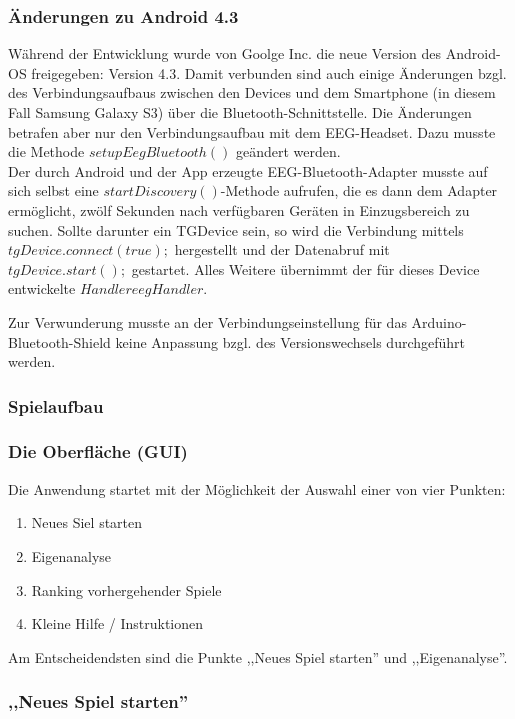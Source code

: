 	\subsubsection*{Änderungen zu Android 4.3}		
		
	Während der Entwicklung wurde von Goolge Inc. die neue Version des Android-OS freigegeben: Version 4.3.
	Damit verbunden sind auch einige Änderungen bzgl. des Verbindungsaufbaus zwischen den Devices und dem Smartphone (in diesem Fall Samsung Galaxy S3) über die Bluetooth-Schnittstelle.
	Die Änderungen betrafen aber nur den Verbindungsaufbau mit dem EEG-Headset. 
	Dazu musste die Methode $setupEegBluetooth()$ geändert werden. \\
	Der durch Android und der App erzeugte EEG-Bluetooth-Adapter musste auf sich selbst eine $startDiscovery()$-Methode aufrufen, die es dann dem Adapter ermöglicht, zwölf Sekunden nach verfügbaren Geräten in Einzugsbereich zu suchen. Sollte darunter ein TGDevice sein, so wird die Verbindung mittels $tgDevice.connect(true);$ hergestellt und der Datenabruf mit $tgDevice.start();$ gestartet. 
	Alles Weitere übernimmt der für dieses Device entwickelte $Handler eegHandler$.
	
	Zur Verwunderung musste an der Verbindungseinstellung für das Arduino-Bluetooth-Shield keine Anpassung bzgl. des Versionswechsels durchgeführt werden.
			
	\newpage	
	\subsubsection{Spielaufbau}
	
	\subsubsection*{Die Oberfläche (GUI)}
	
	Die Anwendung startet mit der Möglichkeit der Auswahl einer von vier Punkten:
	\begin{enumerate}
	\item Neues Siel starten
	\item Eigenanalyse
	\item Ranking vorhergehender Spiele
	\item Kleine Hilfe / Instruktionen
	\end{enumerate}
	
	Am Entscheidendsten sind die Punkte ,,Neues Spiel starten'' und ,,Eigenanalyse''.
	
	\subsubsection*{,,Neues Spiel starten''}
	
